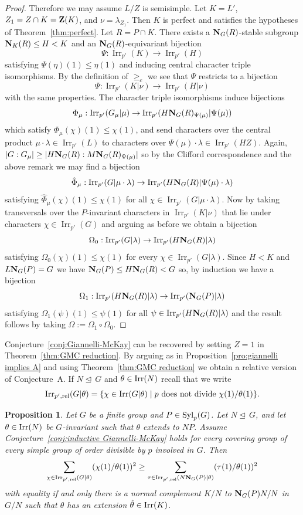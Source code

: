 \documentclass[12pt]{amsart}
\theoremstyle{plain}
\newtheorem{pro}[thm]{Proposition}
\theoremstyle{definition}
\numberwithin{equation}{section}
\newcommand{\Irr}{\operatorname{Irr}}
\def\irr#1{{\rm Irr}(#1)}
\def\irrpr#1{{\rm Irr}_{p',{\rm rel}}(#1)}
\def\syl#1#2{{\rm Syl}_#1(#2)}
\def\nor{\trianglelefteq\,}
\def\zent#1{{\bf Z}(#1)}
\def\norm#1#2{{\bf N}_{#1}(#2)}
\begin{document}
\begin{proof}
Therefore we may assume $L/Z$ is semisimple. Let $K=L'$, $Z_1=Z\cap
K=\zent{K}$, and $\nu=\lambda_{Z_1}$. Then $K$ is perfect and
satisfies the hypotheses of Theorem~\ref{thm:perfect}. Let $R=P\cap
K$. There exists a $\norm G R$-stable subgroup $\norm K R\leq H<K$
and an $\norm G R$-equivariant bijection
$$\Psi:\Irr_{p'}(K)\rightarrow\Irr_{p'}(H)$$ satisfying
$\Psi(\eta)(1)\leq\eta(1)$ and inducing central character triple
isomorphisms. By the definition of $\geq_c$ we see that $\Psi$
restricts to a bijection
$$\Psi:\Irr_{p'}(K|\nu)\rightarrow\Irr_{p'}(H|\nu)$$ with the same properties. The character triple isomorphisms induce bijections $$\Phi_\mu:\Irr_{p'}(G_\mu|\mu)\rightarrow\Irr_{p'}(H\norm G R_{\Psi(\mu)}|\Psi(\mu))$$ which satisfy $\Phi_\mu(\chi)(1)\leq\chi(1)$, and send characters over the central product $\mu\cdot\lambda\in\Irr_{p'}(L)$ to characters over $\Psi(\mu)\cdot\lambda\in\Irr_{p'}(HZ)$. Again, $|G:G_\mu|\geq|H\norm G R:M\norm G R_{\Psi(\mu)}|$ so by the Clifford correspondence and the above remark we may find a bijection
$$\hat\Phi_\mu:\Irr_{p'}(G|\mu\cdot\lambda)\rightarrow\Irr_{p'}(H\norm G R|\Psi(\mu)\cdot\lambda)$$ satisfying
$\hat\Phi_\mu(\chi)(1)\leq\chi(1)$ for all
$\chi\in\Irr_{p'}(G|\mu\cdot\lambda)$. Now by taking transversals
over the $P$-invariant characters in $\Irr_{p'}(K|\nu)$ that lie under characters $\chi\in\Irr_{p'}(G)$ and arguing
as before we obtain a bijection
 $$\Omega_0:\Irr_{p'}(G|\lambda)\rightarrow\Irr_{p'}(H\norm G R|\lambda)$$ satisfying $\Omega_0(\chi)(1)\leq\chi(1)$ for every $\chi\in\Irr_{p'}(G|\lambda)$. Since $H<K$ and $L\norm G P=G$ we have $\norm G P\leq H\norm G R<G$ so, by induction we have a bijection
 $$\Omega_1:\Irr_{p'}(H\norm G R|\lambda)\rightarrow\Irr_{p'}(\norm G P|\lambda)$$ satisfying $\Omega_1(\psi)(1)\leq \psi(1)$ for all $\psi\in\Irr_{p'}(H\norm G R|\lambda)$ and the result follows by taking $\Omega:=\Omega_1\circ\Omega_0$.
\end{proof}

Conjecture~\ref{conj:Giannelli-McKay} can be recovered by setting
$Z=1$ in Theorem~\ref{thm:GMC reduction}. By arguing as in
Proposition~\ref{pro:giannelli implies A} and using
Theorem~\ref{thm:GMC reduction} we obtain a relative version of
Conjecture~A. If $N\nor G$ and $\theta\in\irr N$ recall that we write
$$\irrpr{G|\theta}=\{\chi\in\irr{G|\theta}\mid
p \text{ does not divide } \chi(1)/\theta(1)\}.$$
\begin{pro}
Let $G$ be a finite group and $P \in \syl pG$. Let $N \nor G$, and
let $\theta \in \irr N$ be $G$-invariant such that $\theta$ extends
to $NP$. Assume Conjecture~\ref{conj:inductive Giannelli-McKay}
holds for every covering group of every simple group of order
divisible by $p$ involved in $G$. Then
$$\sum_{\chi \in \irrpr{G|\theta}} (\chi(1)/\theta(1))^2 \ge \sum_{\tau \in \irrpr{N\norm GP|\theta}} (\tau(1)/\theta(1))^2$$
with equality if and only  there is a normal complement $K/N$ to
$\norm GP N/N$ in $G/N$ such that $\theta$ has an extension
$\hat\theta \in \irr K$.
\end{pro}
\end{document}
